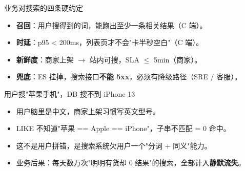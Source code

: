 \documentclass[aspectratio=169,11pt]{beamer}
\begin{document}
\begin{frame}[shrink]{业务对搜索的四条硬约定}
\begin{itemize}
  \item \textbf{召回}：用户搜得到的词，能跑出至少一条相关结果（C 端）。
  \item \textbf{时延}：p95 < 200ms，列表页才不会"卡半秒空白"（C 端）。
  \item \textbf{新鲜度}：商家上架 $\to$ 站内可搜，SLA $\le$ 5min（商家）。
  \item \textbf{兜底}：ES 挂掉，搜索接口\textbf{不能 5xx}，必须有降级路径（SRE / 客服）。
\end{itemize}
\vspace{2mm}
\end{frame}

\begin{frame}[shrink]{用户搜"苹果手机"，DB 搜不到 iPhone 13}
\vspace{2mm}
\begin{itemize}
  \item 用户脑里是中文，商家上架习惯写英文型号。
  \item LIKE 不知道"苹果 == Apple == iPhone"，子串不匹配 = 0 命中。
  \item 这不是用户拼错，是搜索系统欠用户一个"分词 + 同义"能力。
  \item 业务后果：每天数万次"明明有货却 0 结果"的搜索，全部计入\textbf{静默流失}。
\end{itemize}
\end{frame}
\end{document}
